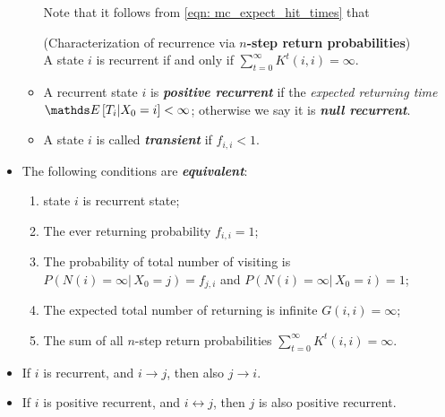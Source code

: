 \documentclass[11pt]{article}
\begin{document}
\begin{itemize}
\begin{itemize}
Note that it follows from \eqref{eqn: mc_expect_hit_times} that 
\begin{proposition} (Characterization of recurrence via \textbf{$n$-step return probabilities})\\
A state $i$ is recurrent if and only if $\sum_{t=0}^{\infty}K^{t}(i, i) = \infty$.
\end{proposition}

\item \begin{definition} A recurrent state $i$ is \emph{\textbf{positive recurrent}} if the \emph{expected returning time} $\E{}{T_{i} | X_0 = i} < \infty$; otherwise we say it is \emph{\textbf{null recurrent}}.
\end{definition}

\item \begin{definition}  A state $i$ is called \emph{\textbf{transient}} if $f_{i,i} < 1$.
\end{definition}
\end{itemize}


\item 
\begin{proposition}
The following conditions are \emph{\textbf{equivalent}}:
\begin{enumerate}
\item state $i$ is recurrent state;
\item The ever returning probability $f_{i,i} = 1$;
\item The probability of total number of visiting is $P(N(i) = \infty |\, X_{0} = j) = f_{j,i}$ and $P(N(i) = \infty |\, X_{0} = i) = 1$;
\item The expected total number of returning is infinite $G(i, i) = \infty$;
\item The sum of all $n$-step return probabilities $\sum_{t=0}^{\infty}K^{t}(i, i) = \infty$.
\end{enumerate}
\end{proposition}


\item 
\begin{proposition}
If $i$ is recurrent, and $i \rightarrow j$, then also $j \rightarrow i$.
\end{proposition}

\item 
\begin{proposition}
If $i$ is positive recurrent, and $i \leftrightarrow j$, then $j$ is also positive recurrent.
\end{proposition}


\end{itemize}
\end{document}

